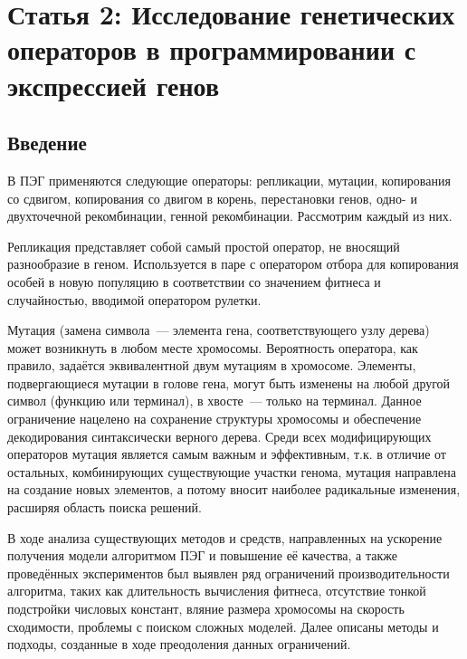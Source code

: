 \section{Статья 2: Исследование генетических операторов в программировании с экспрессией генов}

\subsection{Введение}

В ПЭГ применяются следующие операторы: репликации, мутации, копирования со сдвигом, копирования со двигом в корень, перестановки генов, одно- и двухточечной рекомбинации, генной рекомбинации. Рассмотрим каждый из них.

Репликация представляет собой самый простой оператор, не вносящий разнообразие в геном. Используется в паре с оператором отбора для копирования особей в новую популяцию в соответствии со значением фитнеса и случайностью, вводимой оператором рулетки.

Мутация (замена символа~--- элемента гена, соответствующего узлу дерева) может возникнуть в любом месте хромосомы. Вероятность оператора, как правило, задаётся эквивалентной двум мутациям в хромосоме. Элементы, подвергающиеся мутации в голове гена, могут быть изменены на любой другой символ (функцию или терминал), в хвосте~--- только на терминал. Данное ограничение нацелено на сохранение структуры хромосомы и обеспечение декодирования синтаксически верного дерева. Среди всех модифицирующих операторов мутация является самым важным и эффективным, т.к. в отличие от остальных, комбинирующих существующие участки генома, мутация направлена на создание новых элементов, а потому вносит наиболее радикальные изменения, расширяя область поиска решений.

В ходе анализа существующих методов и средств, направленных на ускорение получения модели алгоритмом ПЭГ и повышение её качества, а также проведённых экспериментов был выявлен ряд ограничений производительности алгоритма, таких как длительность вычисления фитнеса, отсутствие тонкой подстройки числовых констант, вляние размера хромосомы на скорость сходимости, проблемы с поиском сложных моделей. Далее описаны методы и подходы, созданные в ходе преодоления данных ограничений.

